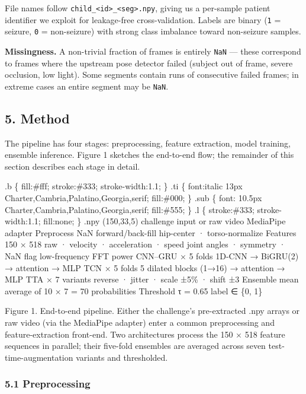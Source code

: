 \documentclass[
  11pt,
]{article}
\begin{document}
File names follow
\texttt{child\_\textless{}id\textgreater{}\_\textless{}seg\textgreater{}.npy},
giving us a per-sample patient identifier we exploit for leakage-free
cross-validation. Labels are binary (\texttt{1} = seizure, \texttt{0} =
non-seizure) with strong class imbalance toward non-seizure samples.

\textbf{Missingness.} A non-trivial fraction of frames is entirely
\texttt{NaN} --- these correspond to frames where the upstream pose
detector failed (subject out of frame, severe occlusion, low light).
Some segments contain runs of consecutive failed frames; in extreme
cases an entire segment may be \texttt{NaN}.

\subsection{5. Method}\label{method}

The pipeline has four stages: preprocessing, feature extraction, model
training, ensemble inference. Figure 1 sketches the end-to-end flow; the
remainder of this section describes each stage in detail.

.b \{ fill:\#fff; stroke:\#333; stroke-width:1.1; \} .ti \{ font:italic
13px Charter,Cambria,Palatino,Georgia,serif; fill:\#000; \} .sub \{
font: 10.5px Charter,Cambria,Palatino,Georgia,serif; fill:\#555; \} .l
\{ stroke:\#333; stroke-width:1.1; fill:none; \} .npy (150,33,5)
challenge input or raw video MediaPipe adapter Preprocess NaN
forward/back-fill hip-center · torso-normalize Features 150 × 518 raw ·
velocity · acceleration · speed joint angles · symmetry · NaN flag
low-frequency FFT power CNN--GRU × 5 folds 1D-CNN → BiGRU(2) → attention
→ MLP TCN × 5 folds 5 dilated blocks (1→16) → attention → MLP TTA × 7
variants reverse · jitter · scale ±5\% · shift ±3 Ensemble mean average
of 10 × 7 = 70 probabilities Threshold τ = 0.65 label ∈ \{0, 1\}

Figure 1. End-to-end pipeline. Either the challenge's pre-extracted .npy
arrays or raw video (via the MediaPipe adapter) enter a common
preprocessing and feature-extraction front-end. Two architectures
process the 150 × 518 feature sequences in parallel; their five-fold
ensembles are averaged across seven test-time-augmentation variants and
thresholded.

\subsubsection{5.1 Preprocessing}\label{preprocessing}
\end{document}
